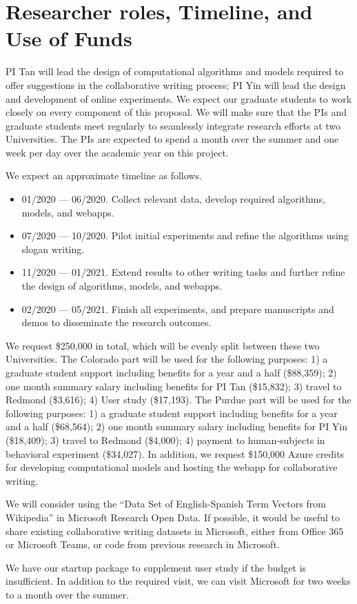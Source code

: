 
\section{Researcher roles, Timeline, and Use of Funds}

PI Tan will lead the design of computational algorithms and models required to offer suggestions in the collaborative writing process;
PI Yin will lead the design and development of online experiments.
We expect our graduate students to work closely on every component of this proposal.
We will make sure that the PIs and graduate students meet regularly to seamlessly integrate research efforts at two Universities.
The PIs are expected to spend a month over the summer and one week per day over the academic year on this project.


 We expect an approximate timeline as follows.

\begin{itemize}[leftmargin=*,noitemsep,topsep=0pt,parsep=0pt,partopsep=0pt]
    \item 01/2020 --- 06/2020. Collect relevant data, develop required algorithms, models, and webapps.
    \item 07/2020 --- 10/2020. Pilot initial experiments and refine the algorithms using slogan writing.
    \item 11/2020 --- 01/2021. Extend results to other writing tasks and further refine the design of algorithms, models, and webapps.
    \item 02/2020 --- 05/2021. Finish all experiments, and prepare manuscripts and demos to disseminate the research outcomes.
\end{itemize}

 We request \$250,000 in total, which will be evenly split between these two Universities.
The Colorado part will be used for the following purposes:
1) a graduate student support including benefits for a year and a half (\$88,359);
2) one month summary salary including benefits for PI Tan (\$15,832);
3) travel to Redmond (\$3,616);
4) User study (\$17,193).
The Purdue part will be used for the following purposes:
1) a graduate student support including benefits for a year and a half (\$68,564);
2) one month summary salary including benefits for PI Yin (\$18,409);
3) travel to Redmond (\$4,000);
4) payment to human-subjects in behavioral experiment (\$34,027).
In addition, we request \$150,000 Azure credits for developing computational models and hosting the webapp for collaborative writing.


 We will consider using the ``Data Set of English-Spanish Term Vectors from Wikipedia'' in Microsoft Research Open Data. 
If possible, it would be useful to share existing collaborative writing datasets in Microsoft, either from Office 365 or Microsoft Teams, or code from previous research in Microsoft.

We have our startup package to supplement user study if the budget is insufficient.
In addition to the required visit, we can visit Microsoft for two weeks to a month over the summer.

